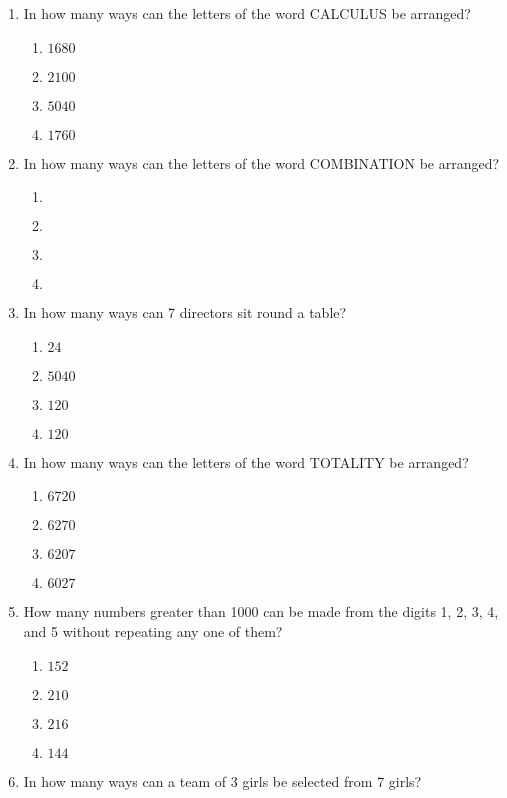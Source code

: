 \begin{multicols}{2}
\begin{enumerate}[label={\arabic*.}]
\begin{enumerate}[label={\Alph*.}]
	\end{enumerate}
\item In how many ways can the letters of the word CALCULUS be arranged?
	\begin{enumerate}[label={\Alph*.}]
	\item \(1680\)
	\item \(2100\)
	\item \(5040\)
	\item \(1760\)
	\end{enumerate}
\item In how many ways can the letters of the word COMBINATION be arranged?
	\begin{enumerate}[label={\Alph*.}]
	\item \(\)
	\item \(\)
	\item \(\)
	\item \(\)
	\end{enumerate}
\item In how many ways can 7 directors sit round a table?
	\begin{enumerate}[label={\Alph*.}]
	\item \(24\)
	\item \(5040\)
	\item \(120\)
	\item \(120\)
	\end{enumerate}
\item In how many ways can the letters of the word TOTALITY be arranged?
	\begin{enumerate}[label={\Alph*.}]
	\item \(6720\)
	\item \(6270\)
	\item \(6207\)
	\item \(6027\)
	\end{enumerate}
\item How many numbers greater than 1000 can be made from the digits 1, 2, 3, 4, and 5 without repeating any one of them?
	\begin{enumerate}[label={\Alph*.}]
	\item \(152\)
	\item \(210\)
	\item \(216\)
	\item \(144\)
	\end{enumerate}
\item In how many ways can a team of 3 girls be selected from 7 girls? 
	\begin{enumerate}[label={\Alph*.}]

\end{enumerate}
\end{enumerate}
\end{multicols}
